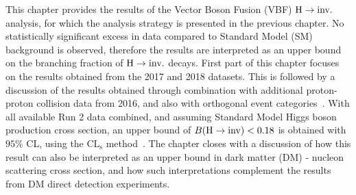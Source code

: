 \label{chapter:results}

This chapter provides the results of the Vector Boson Fusion (VBF) $\textrm{H} \rightarrow \textrm{inv.}$ 
analysis, for which the analysis strategy is presented in the previous chapter.
No statistically significant excess in data compared to Standard Model (SM) background
is observed, therefore the results are interpreted as an upper bound on the
branching fraction of $\textrm{H} \rightarrow \textrm{inv.}$ decays.
First part of this chapter focuses on the results obtained 
from the 2017 and 2018 datasets. This is followed by a discussion of the results 
obtained through combination with additional proton-proton collision data from 
2016, and also with orthogonal event categories~\cite{VBFHinvAnalysisPaper}.
With all available Run 2 data combined, and assuming Standard Model Higgs boson production
cross section, an upper bound of ${B(\textrm{H}\rightarrow\text{inv})} < 0.18$ is obtained with $95\%$ CL,
using the $\mathrm{CL_{s}}$ method~\cite{Junk:1999kv}. 
The chapter closes with a discussion of how this result can also be interpreted 
as an upper bound in dark matter (DM) - nucleon scattering cross section, and how such
interpretations complement the results from DM direct detection experiments.

\finishchapterabstract






